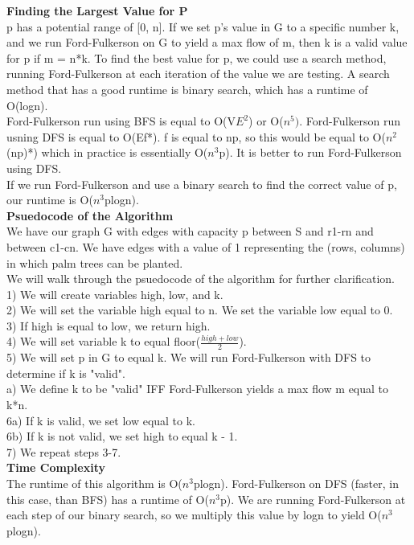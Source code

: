 \documentclass[11pt, solution, letterpaper]{format}
\begin{document}
\textbf{Finding the Largest Value for P}\\
p has a potential range of [0, n]. If we set p's value in G to a specific number k, and we run Ford-Fulkerson on G to yield a max flow of m, then k is a valid value for p if m = n*k. To find the best value for p, we could use a search method, running Ford-Fulkerson at each iteration of the value we are testing. A search method that has a good runtime is binary search, which has a runtime of O(logn). \\

Ford-Fulkerson run using BFS is equal to O(V$E^2$) or O($n^5)$. Ford-Fulkerson run usning DFS is equal to O(Ef*). f is equal to np, so this would be equal to O($n^2$(np)*) which in practice is essentially O($n^3$p). It is better to run Ford-Fulkerson using DFS.\\

If we run Ford-Fulkerson and use a binary search to find the correct value of p, our runtime is O($n^3$plogn).\\

\textbf{Psuedocode of the Algorithm}\\
We have our graph G with edges with capacity p between S and r1-rn and between c1-cn. We have edges with a value of 1 representing the (rows, columns) in which palm trees can be planted. \\

We will walk through the psuedocode of the algorithm for further clarification.\\
1) We will create variables high, low, and k.\\
2) We will set the variable high equal to n. We set the variable low equal to 0.\\
3) If high is equal to low, we return high.\\
4) We will set variable k to equal floor($\frac{high + low}{2}$). \\
5) We will set p in G to equal k. We will run Ford-Fulkerson with DFS to determine if k is "valid".\\
a) We define k to be "valid" IFF Ford-Fulkerson yields a max flow m equal to k*n. \\
6a) If k is valid, we set low equal to k.\\
6b) If k is not valid, we set high to equal k - 1.\\
7) We repeat steps 3-7.\\


\textbf{Time Complexity}\\
The runtime of this algorithm is O($n^3$plogn). Ford-Fulkerson on DFS (faster, in this case, than BFS) has a runtime of O($n^3$p). We are running Ford-Fulkerson at each step of our binary search, so we multiply this value by logn to yield O($n^3$plogn).\\
\end{document}
